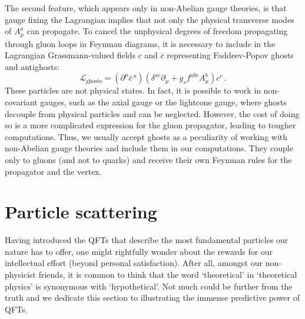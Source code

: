 \documentclass[main.tex]{subfiles}
\begin{document}
The second feature, which appears only in non-Abelian gauge theories, is that gauge fixing the Lagrangian implies that not only the physical transverse modes of $A^a_\mu$ can propagate. To cancel the unphysical degrees of freedom propagating through gluon loops in Feynman diagrams, it is necessary to include in the Lagrangian Grassmann-valued fields $c$ and $\bar{c}$ representing Faddeev-Popov ghosts and antighosts:
\begin{equation} \label{eq:ghosts}
    \mathcal{L}_\text{ghosts} = (\partial^\mu \bar{c}^{\,a})(\delta^{ac} \partial_\mu + g_s f^{abc} A^b_\mu ) c^c\,.
\end{equation}
These particles are not physical states. In fact, it is possible to work in non-covariant gauges, such as the axial gauge or the lightcone gauge, where ghosts decouple from physical particles and can be neglected. However, the cost of doing so is a more complicated expression for the gluon propagator, leading to tougher computations. Thus, we usually accept ghosts as a peculiarity of working with non-Abelian gauge theories and include them in our computations. They couple only to gluons (and not to quarks) and receive their own Feynman rules for the propagator and the vertex.

\section{Particle scattering} \label{sec:particlescattering}
Having introduced the QFTs that describe the most fundamental particles our nature has to offer, one might rightfully wonder about the rewards for our intellectual effort (beyond personal satisfaction). After all, amongst our non-physicist friends, it is common to think that the word `theoretical' in `theoretical physics' is synonymous with `hypothetical'. Not much could be further from the truth and we dedicate this section to illustrating the immense predictive power of QFTs.
\end{document}
